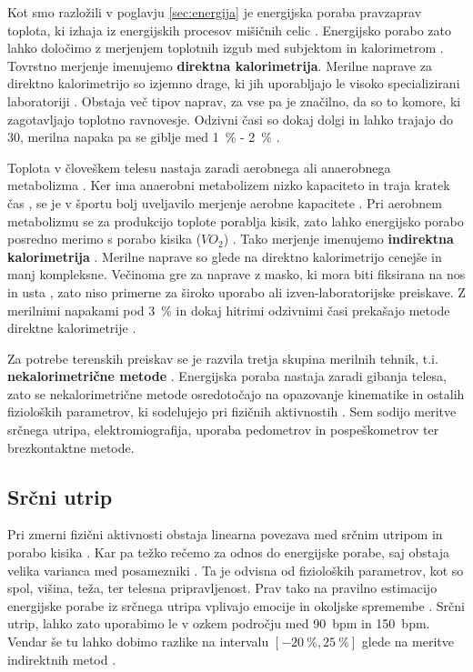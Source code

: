 Kot smo razložili v poglavju \ref{sec:energija} je energijska poraba pravzaprav toplota, ki izhaja iz energijskih procesov mišičnih celic \cite{scott2005misconceptions}. Energijsko porabo zato lahko določimo z merjenjem toplotnih izgub med subjektom in kalorimetrom \cite{levine2005measurement}. Tovrstno merjenje imenujemo \textbf{direktna kalorimetrija}. Merilne naprave za direktno kalorimetrijo so izjemno drage, ki jih uporabljajo le visoko specializirani laboratoriji \cite{levine2005measurement}. Obstaja več tipov naprav, za vse pa je značilno, da so to komore, ki zagotavljajo toplotno ravnovesje. Odzivni časi so dokaj dolgi in lahko trajajo do \SI{30}{\min}, merilna napaka pa se giblje med \SI{1}{\%} - \SI{2}{\%} \cite{levine2005measurement}.

Toplota v človeškem telesu nastaja zaradi aerobnega ali anaerobnega metabolizma \cite{scott2005misconceptions}. Ker ima anaerobni metabolizem nizko kapaciteto in traja kratek čas \cite{sahlin1998energy}, se je v športu bolj uveljavilo merjenje aerobne kapacitete \cite{scott2005misconceptions,howley1995criteria}. Pri aerobnem metabolizmu se za produkcijo toplote porablja kisik, zato lahko energijsko porabo posredno merimo s porabo kisika (${VO}_2$) \cite{scott2005misconceptions}. Tako merjenje imenujemo \textbf{indirektna kalorimetrija} \cite{levine2005measurement}. Merilne naprave so glede na direktno kalorimetrijo cenejše in manj kompleksne. Večinoma gre za naprave z masko, ki mora biti fiksirana na nos in usta \cite{levine2005measurement}, zato niso primerne za široko uporabo ali izven-laboratorijske preiskave. Z merilnimi napakami pod \SI{3}{\%} in dokaj hitrimi odzivnimi časi prekašajo metode direktne kalorimetrije \cite{levine2005measurement}. 

Za potrebe terenskih preiskav se je razvila tretja skupina merilnih tehnik, t.i. \textbf{nekalorimetrične metode} \cite{levine2005measurement}. Energijska poraba nastaja zaradi gibanja telesa, zato se nekalorimetrične metode osredotočajo na opazovanje kinematike in ostalih fizioloških parametrov, ki sodelujejo pri fizičnih aktivnostih \cite{levine2005measurement}. Sem sodijo meritve srčnega utripa, elektromiografija, uporaba pedometrov in pospeškometrov ter brezkontaktne metode.

\subsection{Srčni utrip}\label{sec:srcni-utrip}
Pri zmerni fizični aktivnosti obstaja linearna povezava med srčnim utripom in porabo kisika \cite{keytel2005prediction}. Kar pa težko rečemo za odnos do energijske porabe, saj obstaja velika varianca med posamezniki \cite{levine2005measurement}. Ta je odvisna od fizioloških parametrov, kot so spol, višina, teža, ter telesna pripravljenost. Prav tako na pravilno estimacijo energijske porabe iz srčnega utripa vplivajo emocije in okoljske spremembe \cite{keytel2005prediction}. Srčni utrip, lahko zato uporabimo le v ozkem področju med \SI{90}{bpm} in \SI{150}{bpm}. Vendar še tu lahko dobimo razlike na intervalu $[-20~\% , 25~\%]$ glede na meritve indirektnih metod \cite{keytel2005prediction}. 

